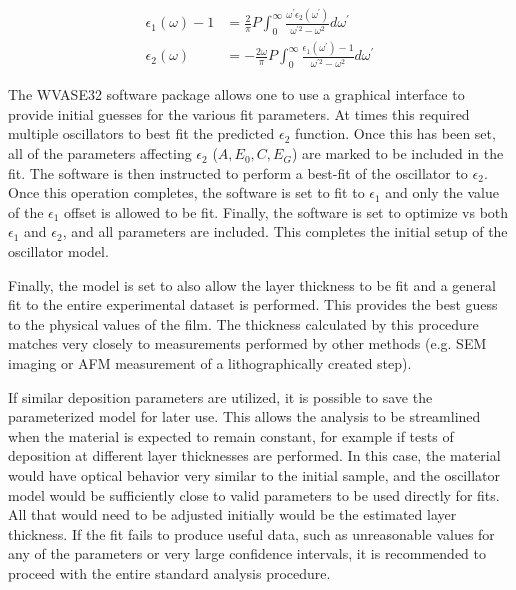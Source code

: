 \begin{subequations}
\label{eq:KK-relation}
\begin{align}
	\epsilon_{1}\left(\omega\right)-1&=\frac{2}{\pi}P\int^{\infty}_{0}\frac{\omega^{\prime}\epsilon_{2}\left(\omega^{\prime}\right)}{\omega^{\prime2}-\omega^{2}}d\omega^{\prime}\\
	\epsilon_{2}\left(\omega\right)&=-\frac{2\omega}{\pi}P\int^{\infty}_{0}\frac{\epsilon_{1}\left(\omega^{\prime}\right)-1}{\omega^{\prime2}-\omega^{2}}d\omega^{\prime}
\end{align}
\end{subequations}

\indent The WVASE32 software package allows one to use a graphical interface to provide initial guesses for the various fit parameters. At times this required multiple oscillators to best fit the predicted $\epsilon_{2}$ function. Once this has been set, all of the parameters affecting $\epsilon_{2}$ ($A, E_{0}, C, E_{G}$) are marked to be included in the fit. The software is then instructed to perform a best-fit of the oscillator to $\epsilon_{2}$. Once this operation completes, the software is set to fit to $\epsilon_{1}$ and only the value of the $\epsilon_{1}$ offset is allowed to be fit. Finally, the software is set to optimize vs both $\epsilon_{1}$ and $\epsilon_{2}$, and all parameters are included. This completes the initial setup of the oscillator model. 

Finally, the model is set to also allow the layer thickness to be fit and a general fit to the entire experimental dataset is performed. This provides the best guess to the physical values of the film. The thickness calculated by this procedure matches very closely to measurements performed by other methods (e.g. SEM imaging or AFM measurement of a lithographically created step). 

If similar deposition parameters are utilized, it is possible to save the parameterized model for later use. This allows the analysis to be streamlined when the material is expected to remain constant, for example if tests of deposition at different layer thicknesses are performed. In this case, the material would have optical behavior very similar to the initial sample, and the oscillator model would be sufficiently close to valid parameters to be used directly for fits. All that would need to be adjusted initially would be the estimated layer thickness. If the fit fails to produce useful data, such as unreasonable values for any of the parameters or very large confidence intervals, it is recommended to proceed with the entire standard analysis procedure. 

